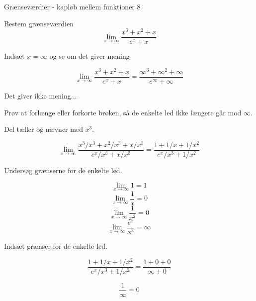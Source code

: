 \documentclass{article}
\begin{document}
\begin{exercise}{Grænseværdier - kapløb mellem funktioner 8}
	
	Bestem grænseværdien 
	\[
	\lim_{x \to \infty} \frac{x^3 + x^2 + x}{e^x + x}
	\]
	
	
	\hint
	Indsæt $x=\infty$ og se om det giver mening
	
	\hint
	\[
	\lim_{x \to \infty} \frac{x^3 + x^2 + x}{e^x + x} = \frac{\infty^3 + \infty^2 + \infty}{e^\infty + \infty}
	\]
	
	\hint
	Det giver ikke mening...
	
	\hint
	Prøv at forlænge eller forkorte brøken, så de enkelte led ikke længere går mod $\infty$. 
	
	\hint
	Del tæller og nævner med $x^3$. 
	
	\hint
	\[
	\lim_{x \to \infty} \frac{x^3/x^3 + x^2/x^3 + x/x^3}{e^x/x^3 + x/x^3} = \frac{1 + 1/x + 1/x^2}{e^x/x^3 + 1/x^2} 
	\]
	
	\hint
	Undersøg grænserne for de enkelte led.
	
	\hint
	\[
	\lim_{x \to \infty} 1 = 1
	\]
	\[
	\lim_{x \to \infty} \frac{1}{x} = 0
	\]
	\[
	\lim_{x \to \infty} \frac{1}{x^2} = 0
	\]
	\[
	\lim_{x \to \infty} \frac{e^x}{x^3} = \infty
	\]
	
	\hint 
	Indsæt grænser for de enkelte led.
	
	\hint
	\[
	\frac{1 + 1/x + 1/x^2}{e^x/x^3 + 1/x^2} = \frac{1 + 0 + 0}{\infty + 0}
	\]
	
	\hint
	\[
	\frac{1 }{\infty } = 0
	\]
	
\end{exercise}
\newpage
\end{document}
